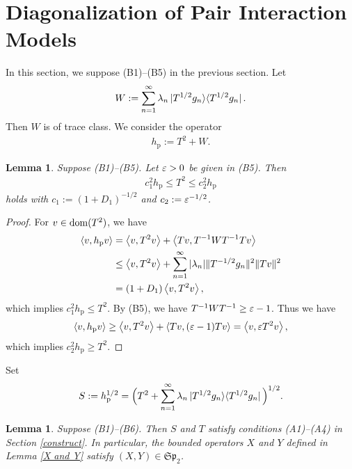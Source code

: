 \documentclass[12pt]{article}
\theoremstyle{plain}
\newtheorem{lem}[theorem]{\bf Lemma}
\numberwithin{equation}{section}
\theoremstyle{remark}
\begin{document}
\section{Diagonalization of Pair Interaction Models}\label{Diagonalization}
In this section, we suppose (B1)--(B5) in the previous section.
Let 
\begin{align}
W := \sum_{n=1}^\infty \lambda_n \ket{T^{1/2}g_n}\! \bra{T^{1/2}g_n}.   \label{Wdef}
\end{align}
Then $W$ is of trace class. 
We consider the operator
\begin{align*}
  h_\mathrm{p} := T^2 + W.
\end{align*}
\begin{lem}\label{bdhp}
  Suppose (B1)--(B5). 
Let $\varepsilon>0$ be given in (B5).
Then
\begin{align*}
    c_1^2 h_\mathrm{p} \leq T^2 \leq c_2^2h_\mathrm{p}
\end{align*}
holds with $c_1 := (1+D_1)^{-1/2}$ and $c_2 := \varepsilon^{-1/2}$.
\end{lem}

\begin{proof}
For $v\in\mathop{\mathrm{dom}}(T^2)$, we have
\begin{align*}
 \left\langle v,h_\mathrm{p}v\right\rangle
& = \left\langle v,T^2v\right\rangle+\left\langle Tv,T^{-1}WT^{-1}Tv\right\rangle \\
 &\leq \left\langle v,T^2v\right\rangle+\sum_{n=1}^\infty|\lambda_n|  \| T^{-1/2}g_n \|^2 \| Tv \|^2 \\
 & = (1+D_1)\left\langle v,T^2v\right\rangle,
\end{align*}
which implies $c_1^2h_\mathrm{p}\leq T^2$. 
By (B5), we have $T^{-1}WT^{-1} \geq \varepsilon-1$. Thus we have
\begin{align*}
 \left\langle v,h_\mathrm{p}v\right\rangle
 \geq \left\langle v,T^2v\right\rangle + \left\langle Tv,(\varepsilon-1)Tv\right\rangle = \left\langle v,\varepsilon T^2v\right\rangle,
\end{align*}
which implies $c_2^2 h_\mathrm{p}\geq T^2$.
\end{proof}
Set
\begin{align}
S:=h_\mathrm{p}^{1/2} = \Big(T^2+\sum_{n=1}^\infty \lambda_n \ket{T^{1/2}g_n}\!\bra{T^{1/2}g_n}\Big)^{1/2}.  \label{defS}
\end{align}
\begin{lem}\label{Bogo OK}
  Suppose (B1)--(B6). Then $S$ and $T$ satisfy conditions (A1)--(A4) in Section \ref{construct}.
In particular, the bounded operators $X$ and $Y$ defined in Lemma \ref{X and Y} satisfy 
$(X,Y)\in\mathfrak{Sp}_2$.
\end{lem}
\end{document}
